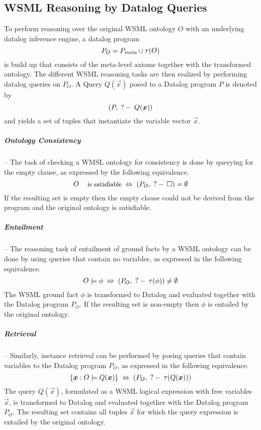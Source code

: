 \subsection{WSML Reasoning by Datalog Queries}

To perform reasoning over the original WSML ontology $O$ with an
underlying datalog inference engine, a datalog program
\begin{displaymath}
    P_O = P_{\textit{\scriptsize{meta}}} \cup \tau(O)
\end{displaymath}
is build up that consists of the meta-level axioms together with
the transformed ontology. The different WSML reasoning tasks are
then realized by performing datalog queries on $P_O$. A Query
$Q(\vec{x})$ posed to a Datalog program $P$ is denoted by
$$(P,\qury Q(\vec{x}))$$ and yields a set of tuples that instantiate
the variable vector $\vec{x}$.

\subparagraph{Ontology Consistency} -- The task of checking a WMSL
ontology for consistency is done by querying for the empty clause,
as expressed by the following equivalence.
\begin{displaymath}
    O \; \textrm{\footnotesize{is satisfiable}} \; \Leftrightarrow \; (P_O , \qury \square) =
    \emptyset
\end{displaymath}
If the resulting set is empty then the empty clause could not be
derived from the program and the original ontology is satisfiable.

\subparagraph{Entailment} -- The reasoning task of entailment of
ground facts by a WSML ontology can be done by using queries that
contain no variables, as expressed in the following equivalence.
\begin{displaymath}
    O \models \phi \; \Leftrightarrow \; (P_O, \;?-\:
    \tau(\phi)) \not= \emptyset
\end{displaymath}
The WSML ground fact $\phi$ is transformed to Datalog and
evaluated together with the Datalog program $P_O$. If the
resulting set is non-empty then $\phi$ is entailed by the original
ontology.

\subparagraph{Retrieval} -- Similarly, instance retrieval can be
performed by posing queries that contain variables to the Datalog
program $P_O$, as expressed in the following equivalence.
\begin{displaymath}
    \{\vec{x} : O \models Q(\vec{x})\} \; \Leftrightarrow \; (P_O, \qury \tau(Q(\vec{x})))
\end{displaymath}
The query $Q(\vec{x})$, formulated as a WSML logical expression
with free variables $\vec{x}$, is transformed to Datalog and
evaluated together with the Datalog program $P_O$. The resulting
set contains all tuples $\vec{x}$ for which the query expression
is entailed by the original ontology.

